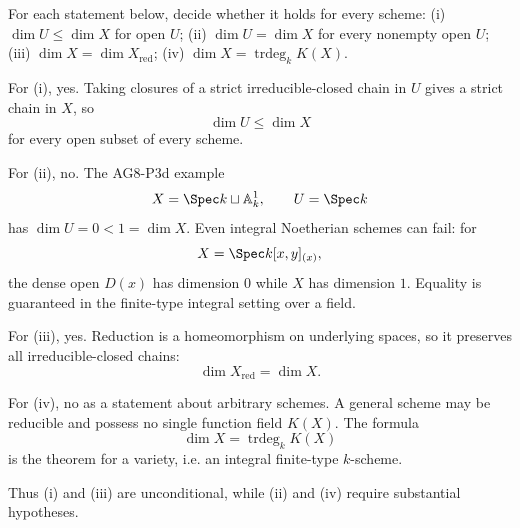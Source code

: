 \begin{problem}\label{prob:vi30-20}
For each statement below, decide whether it holds for every scheme: (i) \(\dim U\leq\dim X\) for open \(U\); (ii) \(\dim U=\dim X\) for every nonempty open \(U\); (iii) \(\dim X=\dim X_{\mathrm{red}}\); (iv) \(\dim X=\operatorname{trdeg}_kK(X)\).

\end{problem}

\ifdefined\FullProblemDossiers
\begin{solution}
For (i), yes. Taking closures of a strict irreducible-closed chain in \(U\) gives a strict chain in \(X\), so
\[
\dim U\le\dim X
\]
for every open subset of every scheme.

For (ii), no. The AG8-P3d example
\[
X=\Spec k\sqcup\mathbb A^1_k,\qquad U=\Spec k
\]
has \(\dim U=0<1=\dim X\). Even integral Noetherian schemes can fail: for
\[
X=\Spec k[x,y]_{(x)},
\]
the dense open \(D(x)\) has dimension \(0\) while \(X\) has dimension \(1\). Equality is guaranteed in the
finite-type integral setting over a field.

For (iii), yes. Reduction is a homeomorphism on underlying spaces, so it preserves all irreducible-closed chains:
\[
\dim X_{\mathrm{red}}=\dim X.
\]

For (iv), no as a statement about arbitrary schemes. A general scheme may be reducible and possess no single
function field \(K(X)\). The formula
\[
\boxed{\dim X=\operatorname{trdeg}_kK(X)}
\]
is the theorem for a variety, i.e. an integral finite-type \(k\)-scheme.

Thus (i) and (iii) are unconditional, while (ii) and (iv) require substantial hypotheses.
\end{solution}
\fi
